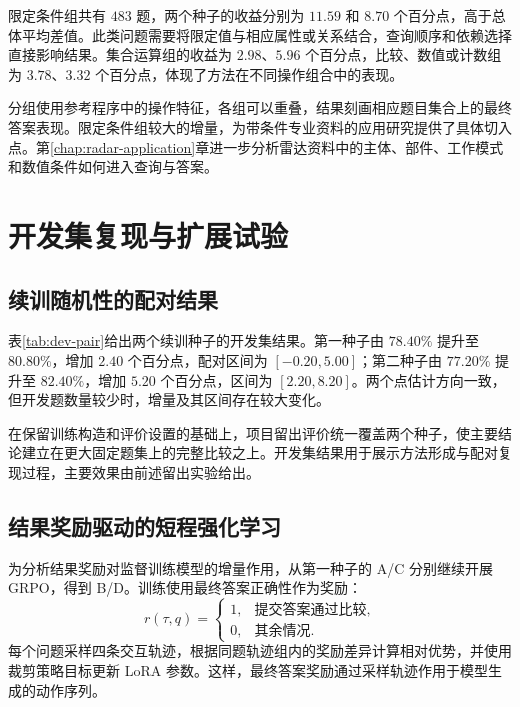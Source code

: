 限定条件组共有 $483$ 题，两个种子的收益分别为 $11.59$ 和 $8.70$ 个百分点，高于总体平均差值。此类问题需要将限定值与相应属性或关系结合，查询顺序和依赖选择直接影响结果。集合运算组的收益为 $2.98$、$5.96$ 个百分点，比较、数值或计数组为 $3.78$、$3.32$ 个百分点，体现了方法在不同操作组合中的表现。

分组使用参考程序中的操作特征，各组可以重叠，结果刻画相应题目集合上的最终答案表现。限定条件组较大的增量，为带条件专业资料的应用研究提供了具体切入点。第\ref{chap:radar-application}章进一步分析雷达资料中的主体、部件、工作模式和数值条件如何进入查询与答案。



\section{开发集复现与扩展试验}

\subsection{续训随机性的配对结果}

\begin{table}[htbp]
  \centering
  \caption{$500$ 题开发集的 A/C 配对结果}
  \label{tab:dev-pair}
  \PublicDevTable
\end{table}

表\ref{tab:dev-pair}给出两个续训种子的开发集结果。第一种子由 $78.40\%$ 提升至 $80.80\%$，增加 $2.40$ 个百分点，配对区间为 $[-0.20,5.00]$；第二种子由 $77.20\%$ 提升至 $82.40\%$，增加 $5.20$ 个百分点，区间为 $[2.20,8.20]$。两个点估计方向一致，但开发题数量较少时，增量及其区间存在较大变化。

在保留训练构造和评价设置的基础上，项目留出评价统一覆盖两个种子，使主要结论建立在更大固定题集上的完整比较之上。开发集结果用于展示方法形成与配对复现过程，主要效果由前述留出实验给出。

\subsection{结果奖励驱动的短程强化学习}

为分析结果奖励对监督训练模型的增量作用，从第一种子的 A/C 分别继续开展 GRPO\cite{shao2024deepseekmath}，得到 B/D。训练使用最终答案正确性作为奖励：
\begin{equation}
  r(\tau,q)=\begin{cases}
    1, & \text{提交答案通过比较},\\
    0, & \text{其余情况}.
  \end{cases}
\end{equation}
每个问题采样四条交互轨迹，根据同题轨迹组内的奖励差异计算相对优势，并使用裁剪策略目标更新 LoRA 参数。这样，最终答案奖励通过采样轨迹作用于模型生成的动作序列。

